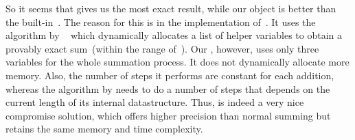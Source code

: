 So it seems that  gives us the most exact result, while our  object is better than the built-in~.
The reason for this is in the implementation of~.
It uses the algorithm by \citeauthor{S1997APFPAAFRGP}~\cite{S1997APFPAAFRGP,H2005BFPSATFPPR} which dynamically allocates a list of helper variables to obtain a provably exact sum~(within the range of~).
Our , however, uses only three variables for the whole summation process.
It does not dynamically allocate more memory.
Also, the number of steps it performs are constant for each addition, whereas the algorithm by \citeauthor{S1997APFPAAFRGP} needs to do a number of steps that depends on the current length of its internal datastructure.
Thus,  is indeed a very nice compromise solution, which offers higher precision than normal summing but retains the same memory and time complexity.%
%
\FloatBarrier%
\endhsection%
%
\endhsection%
